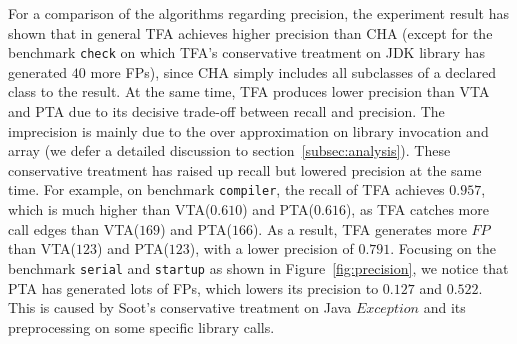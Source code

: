 \documentclass{fac}
\begin{document}

For a comparison of the algorithms regarding precision, the experiment result has shown that in general TFA achieves higher precision than CHA (except for the benchmark \texttt{check} on which TFA's conservative treatment on JDK library has generated $40$ more FPs), since CHA simply includes all subclasses of a declared class to the result. At the same time, TFA produces lower precision than VTA and PTA due to its decisive trade-off between recall and precision. The imprecision is mainly due to the over approximation on library invocation and array (we defer a detailed discussion to section~\ref{subsec:analysis}). These conservative treatment has raised up recall but lowered precision at the same time. For example, on benchmark \texttt{compiler}, the recall of TFA achieves $0.957$, which is much higher than VTA($0.610$) and PTA($0.616$), as TFA catches more call edges than VTA($169$) and PTA($166$). As a result, TFA generates more $FP$ than VTA($123$) and PTA($123$), with a lower precision of $0.791$. Focusing on the benchmark \texttt{serial} and \texttt{startup} as shown in Figure~\ref{fig:precision}, we notice that PTA has generated lots of FPs, which lowers its precision to $0.127$ and $0.522$. This is caused by Soot's conservative treatment on Java $Exception$ and its preprocessing on some specific library calls. %
\end{document}

